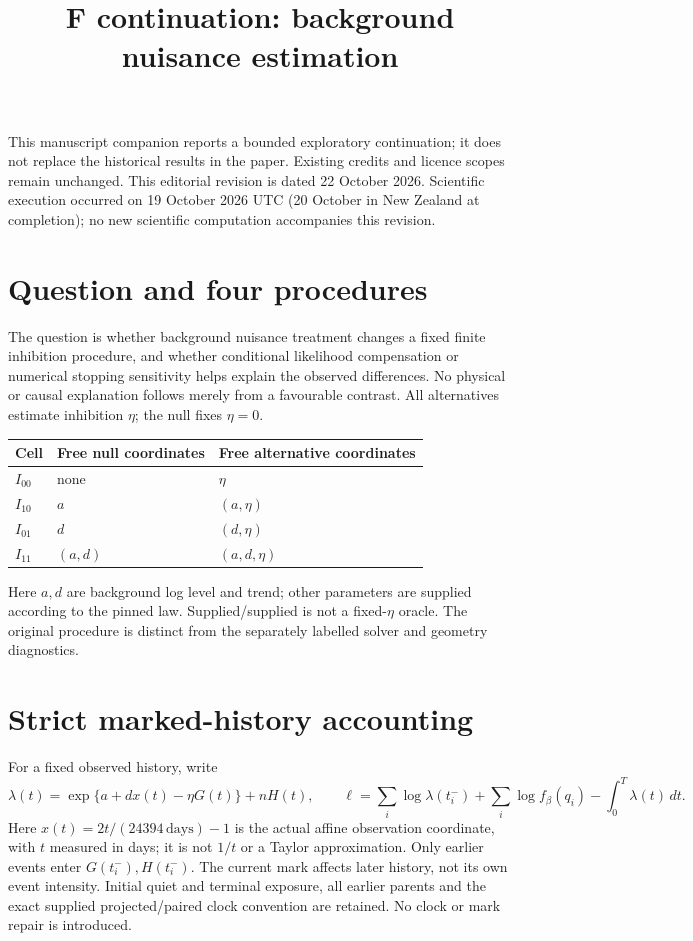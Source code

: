 \documentclass[11pt]{article}
\title{F continuation: background nuisance estimation}
\author{}
\date{\FActualDate}
\begin{document}
\maketitle
\noindent This manuscript companion reports a bounded exploratory continuation;
it does not replace the historical results in the paper. Existing credits and
licence scopes remain unchanged. This editorial revision is dated 22 October
2026. Scientific execution occurred on 19 October 2026 UTC (20 October in
New Zealand at completion); no new scientific computation accompanies this
revision.

\section*{Question and four procedures}
The question is whether background nuisance treatment changes a fixed finite
inhibition procedure, and whether conditional likelihood compensation or
numerical stopping sensitivity helps explain the observed differences.
No physical or causal explanation follows merely from a favourable contrast.
All alternatives estimate inhibition $\eta$; the null fixes $\eta=0$.
\begin{center}
\begin{tabular}{lll}\toprule
Cell & Free null coordinates & Free alternative coordinates\\\midrule
$I_{00}$ & none & $\eta$\\
$I_{10}$ & $a$ & $(a,\eta)$\\
$I_{01}$ & $d$ & $(d,\eta)$\\
$I_{11}$ & $(a,d)$ & $(a,d,\eta)$\\\bottomrule
\end{tabular}
\end{center}
Here $a,d$ are background log level and trend; other parameters are supplied
according to the pinned law. Supplied/supplied is not a fixed-$\eta$ oracle.
The original procedure is distinct from the separately labelled solver
and geometry diagnostics.

\section*{Strict marked-history accounting}
For a fixed observed history, write
\[
 \lambda(t)=\exp\{a+d x(t)-\eta G(t)\}+nH(t),\qquad
 \ell=\sum_i\log\lambda(t_i^-)+\sum_i\log f_\beta(q_i)
       -\int_0^T\lambda(t)\,dt .
\]
Here $x(t)=2t/(24394\,\mathrm{days})-1$ is the actual affine
observation coordinate, with $t$ measured in days; it is not $1/t$ or a
Taylor approximation.
Only earlier events enter $G(t_i^-),H(t_i^-)$. The current mark affects later
history, not its own event intensity. Initial quiet and terminal exposure,
all earlier parents and the exact supplied projected/paired clock convention
are retained. No clock or mark repair is introduced.
\end{document}
